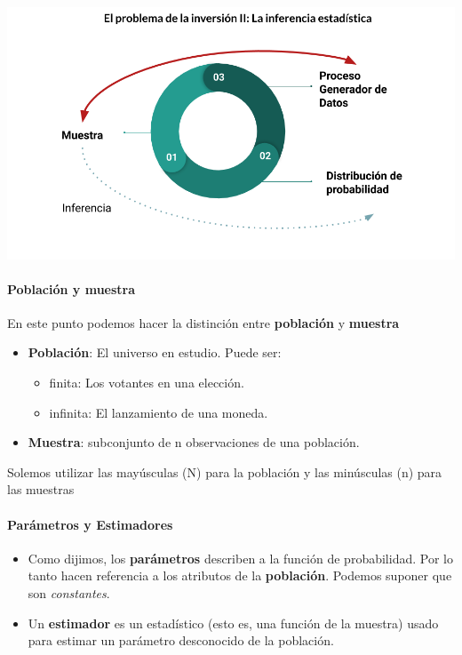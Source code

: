 \documentclass[]{book}
\providecommand{\tightlist}{%
  \setlength{\itemsep}{0pt}\setlength{\parskip}{0pt}}
\let\oldparagraph\paragraph
\renewcommand{\paragraph}[1]{\oldparagraph{#1}\mbox{}}
\begin{document}
\includegraphics[width=10.41667in,height=\textheight]{img/problema_inversion_2.png}

\hypertarget{poblacion-y-muestra}{%
\paragraph{Población y muestra}\label{poblacion-y-muestra}}

En este punto podemos hacer la distinción entre \textbf{población} y \textbf{muestra}

\begin{itemize}
\tightlist
\item
  \textbf{Población}: El universo en estudio. Puede ser:

  \begin{itemize}
  \tightlist
  \item
    finita: Los votantes en una elección.
  \item
    infinita: El lanzamiento de una moneda.
  \end{itemize}
\item
  \textbf{Muestra}: subconjunto de n observaciones de una población.
\end{itemize}

Solemos utilizar las mayúsculas (N) para la población y las minúsculas (n) para las muestras

\hypertarget{parametros-y-estimadores}{%
\paragraph{Parámetros y Estimadores}\label{parametros-y-estimadores}}

\begin{itemize}
\tightlist
\item
  Como dijimos, los \textbf{parámetros} describen a la función de probabilidad. Por lo tanto hacen referencia a los atributos de la \textbf{población}. Podemos suponer que son \emph{constantes}.
\item
  Un \textbf{estimador} es un estadístico (esto es, una función de la muestra) usado para estimar un parámetro desconocido de la población.
\end{itemize}
\end{document}
